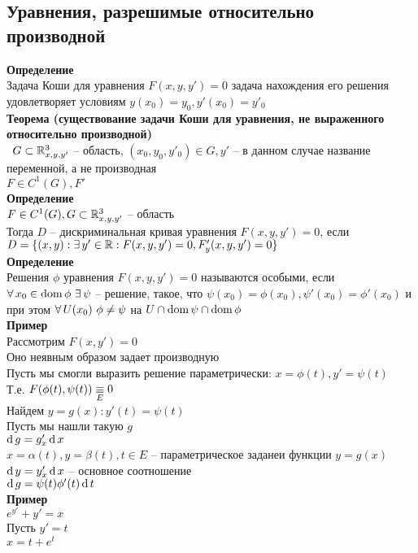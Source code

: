 \documentclass[12pt]{article}
\begin{document}
\subsection{Уравнения, разрешимые относительно производной}
\textbf{Определение}\\
Задача Коши для уравнения $F(x, y, y') = 0$ задача нахождения его решения удовлетворяет условиям $y(x_0)=y_0, y'(x_0) = y'_0$\\
\textbf{Теорема (существование задачи Коши для уравнения, не выраженного относительно производной)}\\\
$G \subset \mathbb{R}^3_{x, y, y'}$ -- область, $(x_0, y_0, y'_0) \in G, y'$ -- в данном случае название переменной, а не производная\\
$F \in C^1(G), F'$\\
\textbf{Определение}\\
$F\in C^1(G), G\subset \mathbb{R}^3_{x,y,y'}$ -- область\\
Тогда $D$ -- дискриминальная кривая уравнения $F(x,y,y') = 0$, если $D=\{(x,y): \exists\, y'\in \mathbb{R}: F(x,y,y')=0, F'_y(x,y,y')=0\}$\\
\textbf{Определение}\\
Решения $\phi$ уравнения $F(x,y,y')=0$ называются особыми, если $\forall\, x_0 \in \operatorname{dom} \phi\ \exists\, \psi$ -- решение, такое, что $\psi(x_0)=\phi(x_0), \psi'(x_0)=\phi'(x_0)$ и при этом $\forall\, U(x_0)\ \phi \neq \psi$ на $U \cap \operatorname{dom} \psi \cap \operatorname{dom} \phi$\\
\textbf{Пример}\\
Рассмотрим $F(x, y') = 0$\\
Оно неявным образом задает производную\\
Пусть мы смогли выразить решение параметрически: $x=\phi(t), y'=\psi(t)$\\
Т.е. $F(\phi(t), \psi(t)) \underset E\equiv 0$\\
Найдем $y = g(x): y'(t)=\psi(t)$\\
Пусть мы нашли такую $g$\\
$\operatorname{d} g = g'_x\operatorname{d} x$\\
$x = \alpha(t), y=\beta(t), t \in E$ -- параметрическое заданеи функции $y=g(x)$\\
$\operatorname{d} y = y'_x\operatorname{d} x$ -- основное соотношение\\
$\operatorname{d} g = \psi(t)\phi'(t)\operatorname{d} t$\\
\textbf{Пример}\\
$e^{y'}+y' = x$\\
Пусть $y'=t$\\
$x = t + e^t$\\
\end{document}

